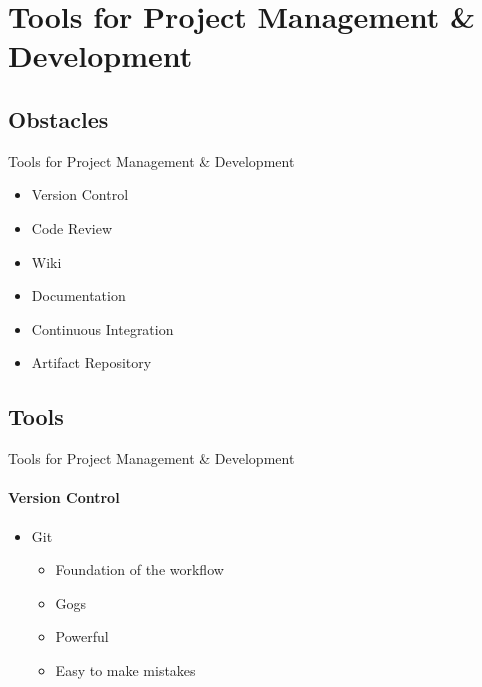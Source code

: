 \section{Tools for Project Management \& Development}
\subsection{Obstacles}
\begin{frame}[t]{Tools for Project Management \& Development}
    \begin{itemize}
        \item Version Control
        \item Code Review
        \item Wiki
        \item Documentation
        \item Continuous Integration
        \item Artifact Repository
    \end{itemize}
\end{frame}
\subsection{Tools}
\begin{frame}[t]{Tools for Project Management \& Development}\framesubtitle{Version Control}
    \begin{itemize}
        \item Git
        \begin{itemize}
            \item Foundation of the workflow
            \item Gogs
            \item Powerful
            \item Easy to make mistakes
        \end{itemize}
    \end{itemize}
\end{frame}

